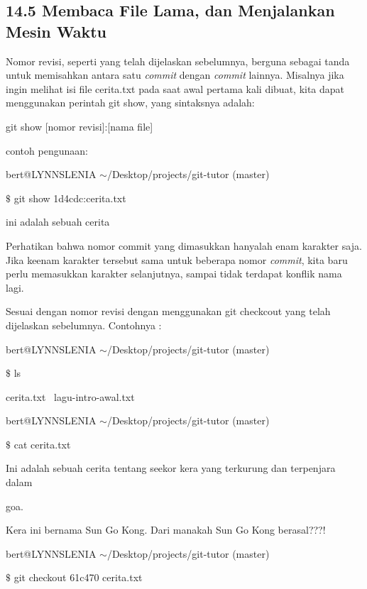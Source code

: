 \subsection*{14.5 Membaca File Lama, dan Menjalankan Mesin Waktu}
 \par
Nomor revisi, seperti yang telah dijelaskan sebelumnya, berguna sebagai tanda untuk memisahkan antara satu \emph{commit} dengan \emph{commit} lainnya. Misalnya jika  ingin melihat isi file cerita.txt pada saat awal pertama kali dibuat, kita dapat menggunakan perintah git show, yang sintaksnya adalah: \par
git show [nomor revisi]:[nama file] \par
\vspace{12pt}
\noindent 
contoh pengunaan: \par
bert@LYNNSLENIA  $  \sim  $/Desktop/projects/git-tutor (master) \par
 $  \$  $ git show 1d4cdc:cerita.txt \par
ini adalah sebuah cerita \par
\vspace{12pt}
Perhatikan bahwa nomor commit yang dimasukkan hanyalah enam karakter saja. Jika keenam karakter tersebut sama untuk beberapa nomor \textit{commit}, kita baru perlu memasukkan karakter selanjutnya, sampai tidak terdapat konflik nama lagi. \par
Sesuai dengan nomor revisi dengan menggunakan {\fontsize{10pt}{10pt}\selectfont git checkcout yang telah dijelaskan sebelumnya. Contohnya :} \par
bert@LYNNSLENIA  $  \sim  $/Desktop/projects/git-tutor (master) \par
 $  \$  $ ls \par
cerita.txt~ lagu-intro-awal.txt \par
\vspace{12pt}
bert@LYNNSLENIA  $  \sim  $/Desktop/projects/git-tutor (master) \par
 $  \$  $ cat cerita.txt \par
Ini adalah sebuah cerita tentang seekor kera yang terkurung dan terpenjara dalam \par
 goa. \par
\vspace{12pt}
Kera ini bernama Sun Go Kong. Dari manakah Sun Go Kong berasal???! \par
\vspace{12pt}
bert@LYNNSLENIA  $  \sim  $/Desktop/projects/git-tutor (master) \par
 $  \$  $ git checkout 61c470 cerita.txt \par

